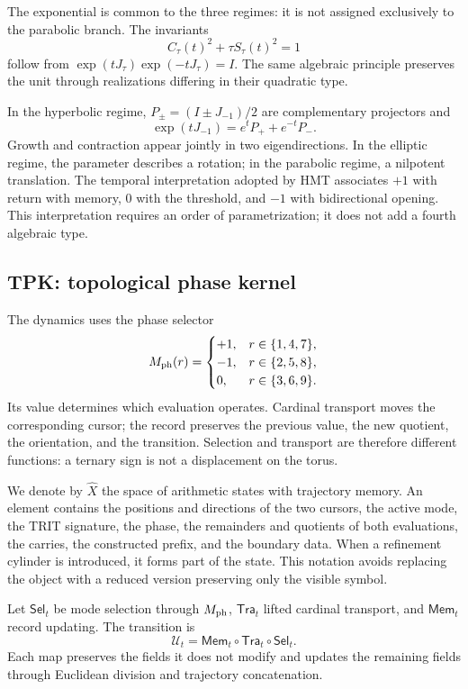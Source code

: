 The exponential is common to the three regimes: it is not assigned exclusively to the parabolic branch. The invariants
\[
 C_\tau(t)^2+\tau S_\tau(t)^2=1
\]
follow from \(\exp(tJ_\tau)\exp(-tJ_\tau)=I\). The same algebraic principle preserves the unit through realizations differing in their quadratic type.

In the hyperbolic regime, \(P_\pm=(I\pm J_{-1})/2\) are complementary projectors and
\[
 \exp(tJ_{-1})=e^tP_++e^{-t}P_-.
\]
Growth and contraction appear jointly in two eigendirections. In the elliptic regime, the parameter describes a rotation; in the parabolic regime, a nilpotent translation. The temporal interpretation adopted by HMT associates \(+1\) with return with memory, \(0\) with the threshold, and \(-1\) with bidirectional opening. This interpretation requires an order of parametrization; it does not add a fourth algebraic type.





\newpage
\subsection{TPK: topological phase kernel}

The dynamics uses the phase selector
\[
 M_{\rm ph}(r)=
 \begin{cases}
 +1,&r\in\{1,4,7\},\\
 -1,&r\in\{2,5,8\},\\
 0,&r\in\{3,6,9\}.
 \end{cases}
\]
Its value determines which evaluation operates. Cardinal transport moves the corresponding cursor; the record preserves the previous value, the new quotient, the orientation, and the transition. Selection and transport are therefore different functions: a ternary sign is not a displacement on the torus.

We denote by \(\widehat X\) the space of arithmetic states with trajectory memory. An element contains the positions and directions of the two cursors, the active mode, the TRIT signature, the phase, the remainders and quotients of both evaluations, the carries, the constructed prefix, and the boundary data. When a refinement cylinder is introduced, it forms part of the state. This notation avoids replacing the object with a reduced version preserving only the visible symbol.

\begin{definition}
Let \(\mathsf{Sel}_t\) be mode selection through \(M_{\rm ph}\), \(\mathsf{Tra}_t\) lifted cardinal transport, and \(\mathsf{Mem}_t\) record updating. The transition is
\begin{equation}
 \mathcal U_t=\mathsf{Mem}_t\circ\mathsf{Tra}_t\circ\mathsf{Sel}_t.
 \label{eq:actualizacion}
\end{equation}
Each map preserves the fields it does not modify and updates the remaining fields through Euclidean division and trajectory concatenation.
\end{definition}

